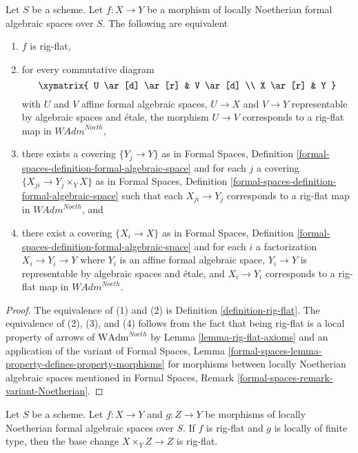 \begin{lemma}
\label{lemma-rig-flat-morphisms}
Let $S$ be a scheme. Let $f : X \to Y$ be a morphism of
locally Noetherian formal algebraic spaces over $S$.
The following are equivalent
\begin{enumerate}
\item $f$ is rig-flat,
\item for every commutative diagram
$$
\xymatrix{
U \ar[d] \ar[r] & V \ar[d] \\
X \ar[r] & Y
}
$$
with $U$ and $V$ affine formal algebraic spaces, $U \to X$ and $V \to Y$
representable by algebraic spaces and \'etale, the morphism $U \to V$
corresponds to a rig-flat map in $\textit{WAdm}^{Noeth}$,
\item there exists a covering $\{Y_j \to Y\}$ as in
Formal Spaces,
Definition \ref{formal-spaces-definition-formal-algebraic-space}
and for each $j$
a covering $\{X_{ji} \to Y_j \times_Y X\}$ as in
Formal Spaces,
Definition \ref{formal-spaces-definition-formal-algebraic-space}
such that each $X_{ji} \to Y_j$  corresponds
to a rig-flat map in $\textit{WAdm}^{Noeth}$, and
\item there exist a covering $\{X_i \to X\}$ as in
Formal Spaces,
Definition \ref{formal-spaces-definition-formal-algebraic-space}
and for each $i$ a factorization $X_i \to Y_i \to Y$ where $Y_i$
is an affine formal algebraic space, $Y_i \to Y$ is representable
by algebraic spaces and \'etale, and $X_i \to Y_i$ corresponds
to a rig-flat map in $\textit{WAdm}^{Noeth}$.
\end{enumerate}
\end{lemma}

\begin{proof}
The equivalence of (1) and (2) is Definition \ref{definition-rig-flat}.
The equivalence of (2), (3), and (4) follows from the fact that
being rig-flat is a local property of arrows of
$\text{WAdm}^{Noeth}$ by Lemma \ref{lemma-rig-flat-axioms}
and an application of the variant of
Formal Spaces, Lemma
\ref{formal-spaces-lemma-property-defines-property-morphisms}
for morphisms between locally Noetherian algebraic spaces
mentioned in
Formal Spaces, Remark
\ref{formal-spaces-remark-variant-Noetherian}.
\end{proof}

\begin{lemma}
\label{lemma-base-change-rig-flat}
Let $S$ be a scheme. Let $f : X \to Y$ and $g : Z \to Y$
be morphisms of locally Noetherian formal algebraic spaces over $S$.
If $f$ is rig-flat and $g$ is locally of finite type, then the base change
$X \times_Y Z \to Z$ is rig-flat.
\end{lemma}

